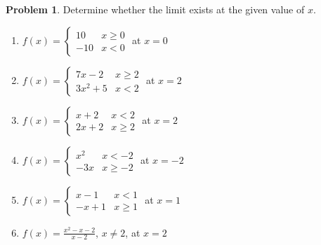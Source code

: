 \documentclass[11pt,a4paper]{article}
\theoremstyle{definition}
\newtheorem{problemx}{Problem}[section]
\newenvironment{problem}{\begin{problemx}}{\end{problemx}}
\begin{document}
\begin{problem}
Determine whether the limit exists at the given value of $x$.
\begin{enumerate}
\item[(a).] $f(x)=\begin{cases}10 & x\geq 0\\ -10 & x<0\end{cases}$ at $x=0$
\item[(b).] $f(x)=\begin{cases}7x-2 & x\geq 2\\ 3x^2+5 & x<2\end{cases}$ at $x=2$
\item[(c).] $f(x)=\begin{cases}x+2 & x<2\\ 2x+2 & x\geq 2\end{cases}$ at $x=2$
\item[(d).] $f(x)=\begin{cases}x^2 & x<-2\\ -3x & x\geq -2\end{cases}$ at $x=-2$
\item[(e).] $f(x)=\begin{cases}x-1 & x<1\\ -x+1 & x\geq 1\end{cases}$ at $x=1$
\item[(f).] $f(x)=\frac{x^2-x-2}{x-2}$, $x\neq 2$, at $x=2$
\end{enumerate}
\end{problem}
\end{document}
